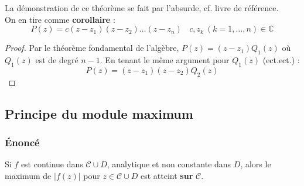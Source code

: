 	La démonstration de ce théorème se fait par l'absurde, cf. livre de référence. \\
	On en tire comme \textbf{corollaire} :
	\begin{equation}
	P(z) = c(z-z_1)(z-z_2)\dots(z-z_n)\ \ \ \ c,z_k\ (k=1,\dots,n) \in \mathbb{C}
	\end{equation}
	\begin{proof}
	Par le théorème fondamental de l'algèbre, $P(z) = (z-z_1)Q_1(z)$ où $Q_1(z)$ est de degré $n-1$.
	En tenant le même argument pour $Q_1(z)$ (ect.ect.) :
	\begin{equation}
	P(z) = (z-z_1)(z-z_2)Q_2(z)
	\end{equation}
	\end{proof}
	
	\subsection{Principe du module maximum}
		\subsubsection{Énoncé}
		Si $f$ est continue dans $\mathcal{C} \cup D$, analytique et non constante dans $D$, alors le 
		maximum de $|f(z)|$ pour $z \in \mathcal{C} \cup D$ est atteint \textbf{sur} $\mathcal{C}$.\\
		
	
